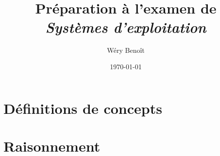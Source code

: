 

\newcommand{\quest}[2]{\textcolor{dkblue}{\textit{#1}}\vspace*{.2cm}\par\hspace*{.5cm}#2}

\newcommand{\vrai}[0]{\textcolor{dkgreen}{Vrai}}
\newcommand{\faux}[0]{\textcolor{dkred}{Faux}}

\author{Wéry Benoît}
\title{Préparation à l'examen de \textit{Systèmes d'exploitation}}
\date{\today}



\maketitle

\chapter{Définitions de concepts}

\begin{enumerate}\setlength\itemsep{1em}





\end{enumerate}


\chapter{Raisonnement}
\begin{enumerate}\setlength\itemsep{1em}


\end{enumerate}


